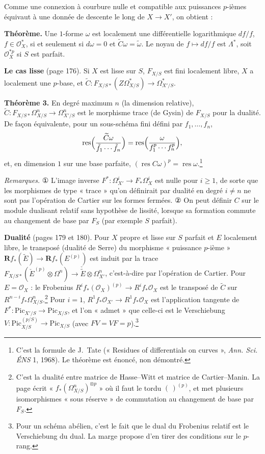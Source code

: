 \documentclass[11pt,a4paper]{article}
\begin{document}
Comme une connexion à courbure nulle et compatible aux puissances $p$-ièmes
équivaut à une donnée de descente le long de $X \to X'$, on obtient :

\textbf{Théorème.} Une $1$-forme $\omega$ est localement une différentielle
logarithmique $df/f$, $f \in \mathcal{O}_X^*$, si et seulement si $d\omega = 0$
et $\widetilde C\omega = \tilde\omega$. Le noyau de $f \mapsto df/f$ est
$\Lambda^*$, soit $\mathcal{O}_X^{*p}$ si $S$ est parfait.

\textbf{Le cas lisse} (page 176). Si $X$ est lisse sur $S$, $F_{X/S}$ est fini
localement libre, $X$ a localement une $p$-base, et
$\widetilde C : F_{X/S*}(Z\Omega^*_{X/S}) \to \Omega^*_{X'/S}$.

\textbf{Théorème 3.} En degré maximum $n$ (la dimension relative), $\widetilde
C : F_{X/S*}\Omega^n_{X/S} \to \Omega^n_{X'/S}$ est le morphisme trace (de
Gysin) de $F_{X/S}$ pour la dualité. De façon équivalente, pour un
sous-schéma fini défini par $f_1, \ldots, f_n$,
\[
  \operatorname{res}\Bigl(\frac{\widetilde C\omega}{\tilde f_1 \cdots \tilde f_n}\Bigr)
  = \operatorname{res}\Bigl(\frac{\omega}{f_1^p \cdots f_n^p}\Bigr),
\]
et, en dimension $1$ sur une base parfaite, $(\operatorname{res} C\omega)^p =
\operatorname{res}\omega$.\footnote{C'est la formule de J.~Tate (« Residues of
differentials on curves », \emph{Ann. Sci. ÉNS} 1, 1968). Le théorème est
énoncé, non démontré.}

\emph{Remarques.} ① L'image inverse $F^* : \Omega^i_{X'} \to F_*\Omega^i_X$ est
nulle pour $i \geq 1$, de sorte que les morphismes de type « trace » qu'on
définirait par dualité en degré $i \neq n$ ne sont pas l'opération de
Cartier sur les formes fermées. ② On peut définir $C$ sur le module dualisant
relatif sans hypothèse de lissité, lorsque sa formation commute au
changement de base par $F_S$ (par exemple $S$ parfait).

\textbf{Dualité} (pages 179 et 180). Pour $X$ propre et lisse sur $S$ parfait et
$E$ localement libre, le transposé (dualité de Serre) du morphisme
« puissance $p$-ième » $\mathbf{R}f_*(\widetilde E) \to \mathbf{R}f_*(E^{(p)})$ est
induit par la trace $F_{X/S*}(\check E^{(p)} \otimes \Omega^n) \to \check{\widetilde E}
\otimes \Omega^n_{X'}$, c'est-à-dire par l'opération de Cartier. Pour $E =
\mathcal{O}_X$ : le Frobenius $R^if_*(\mathcal{O}_X)^{(p)} \to R^if_*\mathcal{O}_X$
est le transposé de $\widetilde C$ sur $R^{n-i}f_*\Omega^n_{X/S}$.\footnote{C'est
la dualité entre matrice de Hasse--Witt et matrice de Cartier--Manin. La page
écrit « $f_*(\Omega^n_{X/S})^{\otimes p}$ » où il faut le tordu
$(\,)^{(p)}$, et met plusieurs isomorphismes « sous réserve » de commutation
au changement de base par $F_S$.} Pour $i = 1$, $R^1f_*\mathcal{O}_{X'} \to
R^1f_*\mathcal{O}_X$ est l'application tangente de $F^* : \mathrm{Pic}_{X'/S}
\to \mathrm{Pic}_{X/S}$, et l'on « admet » que celle-ci est le Verschiebung
$V : \mathrm{Pic}^{(p/S)}_{X/S} \to \mathrm{Pic}_{X/S}$ (avec $FV = VF =
p$).\footnote{Pour un schéma abélien, c'est le fait que le dual du Frobenius
relatif est le Verschiebung du dual. La marge propose d'en tirer des
conditions sur le $p$-rang.}
\end{document}
